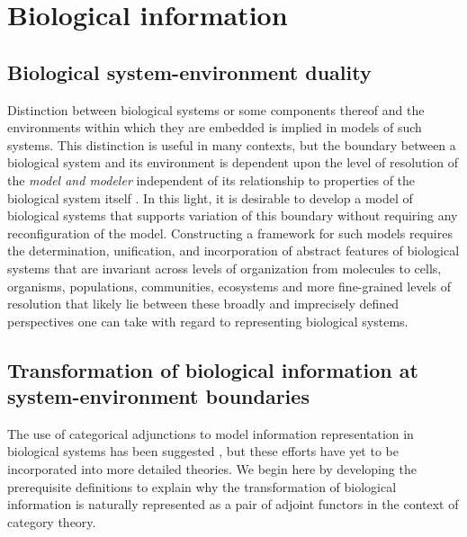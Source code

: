 \documentclass[aps,twocolumn]{revtex4}
\begin{document}
\section{Biological information}
\subsection{Biological system-environment duality}
Distinction between biological systems or some components thereof and the environments within which they are embedded is implied in models of such systems. This distinction is useful in many contexts, but the boundary between a biological system and its environment is dependent upon the level of resolution of the \emph{model and modeler} independent of its relationship to properties of the biological system itself \cite{Fontana1996}. In this light, it is desirable to develop a model of biological systems that supports variation of this boundary without requiring any reconfiguration of the model. Constructing a framework for such models requires the determination, unification, and incorporation of abstract features of biological systems that are invariant across levels of organization from molecules to cells, organisms, populations, communities, ecosystems and more fine-grained levels of resolution that likely lie between these broadly and imprecisely defined perspectives one can take with regard to representing biological systems.


\subsection{Transformation of biological information at system-environment boundaries}
The use of categorical adjunctions to model information representation in biological systems has been suggested \cite{GOGUEN1979,Ellerman2007,Ellerman2008}, but these efforts have yet to be incorporated into more detailed theories. We begin here by developing the prerequisite definitions to explain why the transformation of biological information is naturally represented as a pair of adjoint functors in the context of category theory.
\end{document}
